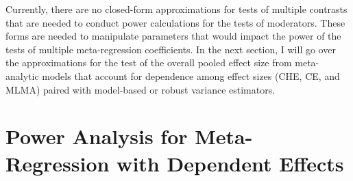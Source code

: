 
Currently, there are no closed-form approximations for tests of multiple contrasts that are needed to conduct power calculations for the tests of moderators. These forms are needed to manipulate parameters that would impact the power of the tests of multiple meta-regression coefficients. In the next section, I will go over the approximations for the test of the overall pooled effect size from meta-analytic models that account for dependence among effect sizes (CHE, CE, and MLMA) paired with model-based or robust variance estimators. 







\section{Power Analysis for Meta-Regression with Dependent Effects}

